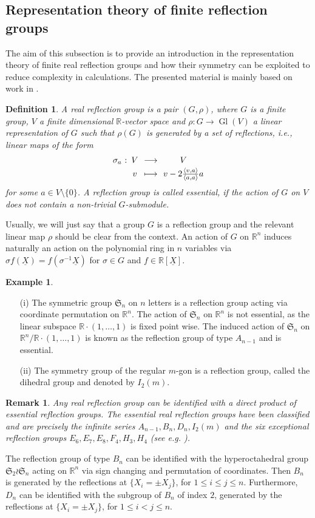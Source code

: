 \documentclass[11pt,a4paper]{amsart}
\newcommand{\abb}[5]{%
\setlength{\arraycolsep}{0.4ex}%
\begin{array}{rcccc}%
#1 &:\,& #2 & \,\,\longrightarrow\,\, & #3 \\[0.5ex]%
     & & #4 & \longmapsto & #5%
\end{array}%
}
\numberwithin{equation}{section}
\newtheorem{definition}[thm]{Definition}
\newtheorem{remark}[thm]{Remark}
\theoremstyle{definition}
\newtheorem{example}[thm]{Example}
\newcommand{\R}{\mathbb{R}}
\DeclareMathOperator{\Gl}{Gl}
\numberwithin{thm}{section}
\theoremstyle{break}
\numberwithin{subcase}{case}
\begin{document}
\subsection{Representation theory of finite reflection groups}
The aim of this subsection is to provide an introduction in the representation theory of finite real reflection groups and how their symmetry can be exploited to reduce complexity in calculations. The presented material is mainly based on work in \cite{gatermann2004symmetry, valentin, blekrie}.
\begin{definition}
A real reflection group is a pair $(G,\rho)$, where $G$ is a finite group, $V$ a finite dimensional $\R$-vector space and $\rho : G \rightarrow \Gl (V)$ a linear representation of $G$ such that $\rho(G)$ is generated by a set of reflections, i.e., linear maps of the form $$ \abb{\sigma_a}{V}{V}{v}{v - 2\frac{\langle v,a \rangle}{\langle a, a \rangle} a}$$ for some $a \in V \setminus \{0\}$. A reflection group is called essential, if the action of $G$ on $V$ does not contain a non-trivial $G$-submodule.
\end{definition}
Usually, we will just say that a group $G$ is a reflection group and the relevant linear map $\rho$ should be clear from the context. An action of $G$ on $\R^n$ induces naturally an action on the polynomial ring in $n$ variables via $\sigma f(\underline{X}) = f(\sigma^{-1} \underline{X})$ for $\sigma \in G$ and $f \in \R[\underline{X}]$. 
\begin{example}
\begin{enumerate}
\item[(i)] The symmetric group $\mathfrak{S}_n$ on $n$ letters is a reflection group acting via coordinate permutation on $\R^n$. The action of $\mathfrak{S}_n$ on $\R^n$ is not essential, as the linear subspace $\R \cdot (1,\ldots,1)$ is fixed point wise. The induced action of $\mathfrak{S}_n$ on $\R^n / \R \cdot (1,\ldots,1)$ is known as the reflection group of type $A_{n-1}$ and is essential.
\item[(ii)]The symmetry group of the regular $m$-gon is a reflection group, called the dihedral group and denoted by $I_2(m)$.
\end{enumerate}
\end{example}
\begin{remark}
Any real reflection group can be identified with a direct product of essential reflection groups. The essential real reflection groups have been classified and are precisely the infinite series $A_{n-1},B_n,D_n,I_2(m)$ and the six exceptional reflection groups $E_6,E_7,E_8,F_4,H_3,H_4$ (see e.g. \cite{humphreys1990reflection}).
\end{remark}
The reflection group of type $B_n$ can be identified with the hyperoctahedral group $\mathfrak{S}_2 \wr \mathfrak{S}_n$ acting on $\R^n$ via sign changing and permutation of coordinates. Then $B_n$ is generated by the reflections at $\{X_i=\pm X_j\}$, for $1 \leq i \leq j \leq n$. Furthermore, $D_n$ can be identified with the subgroup of $B_n$ of index $2$, generated by the reflections at $\{X_i=\pm X_j\}$, for $1 \leq i < j \leq n$. 
\end{document}
